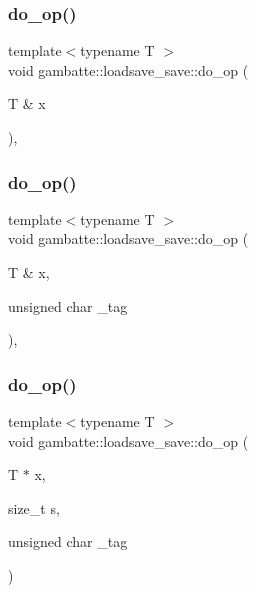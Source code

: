 \subsubsection{\texorpdfstring{do\+\_\+op()}{do\_op()}\hspace{0.1cm}{\footnotesize\ttfamily [1/3]}}
{\footnotesize\ttfamily template$<$typename T $>$ \\
void gambatte\+::loadsave\+\_\+save\+::do\+\_\+op (\begin{DoxyParamCaption}\item[{T \&}]{x }\end{DoxyParamCaption})\hspace{0.3cm}{\ttfamily [inline]}, {\ttfamily [private]}}

\mbox{\label{classgambatte_1_1loadsave__save_ad41375ee1f0a3f60004868678227c23b}} 
\subsubsection{\texorpdfstring{do\+\_\+op()}{do\_op()}\hspace{0.1cm}{\footnotesize\ttfamily [2/3]}}
{\footnotesize\ttfamily template$<$typename T $>$ \\
void gambatte\+::loadsave\+\_\+save\+::do\+\_\+op (\begin{DoxyParamCaption}\item[{T \&}]{x,  }\item[{unsigned char}]{\+\_\+tag }\end{DoxyParamCaption})\hspace{0.3cm}{\ttfamily [inline]}, {\ttfamily [private]}}

\mbox{\label{classgambatte_1_1loadsave__save_a454e46b0fb18f61513f1632afa2db806}} 
\subsubsection{\texorpdfstring{do\+\_\+op()}{do\_op()}\hspace{0.1cm}{\footnotesize\ttfamily [3/3]}}
{\footnotesize\ttfamily template$<$typename T $>$ \\
void gambatte\+::loadsave\+\_\+save\+::do\+\_\+op (\begin{DoxyParamCaption}\item[{T $\ast$}]{x,  }\item[{size\+\_\+t}]{s,  }\item[{unsigned char}]{\+\_\+tag }\end{DoxyParamCaption})\hspace{0.3cm}{\ttfamily [private]}}

